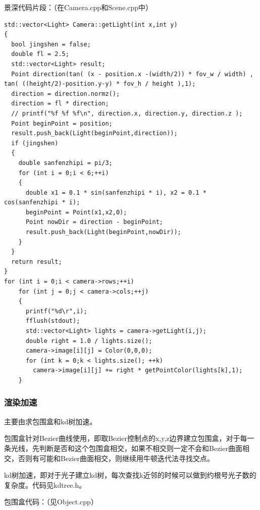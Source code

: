 \documentclass[10pt, a4paper]{article}
\begin{document}
          景深代码片段：（在Camera.cpp和Scene.cpp中）
          \begin{lstlisting}
std::vector<Light> Camera::getLight(int x,int y)
{
  bool jingshen = false;
  double fl = 2.5;
  std::vector<Light> result;
  Point direction(tan( (x - position.x -(width/2)) * fov_w / width) , tan( ((height/2)-position.y-y) * fov_h / height ),1);
  direction = direction.normz();
  direction = fl * direction;
  // printf("%f %f %f\n", direction.x, direction.y, direction.z );
  Point beginPoint = position;
  result.push_back(Light(beginPoint,direction));
  if (jingshen)
  {
    double sanfenzhipi = pi/3;
    for (int i = 0;i < 6;++i)
    {
      double x1 = 0.1 * sin(sanfenzhipi * i), x2 = 0.1 * cos(sanfenzhipi * i);
      beginPoint = Point(x1,x2,0);
      Point nowDir = direction - beginPoint;
      result.push_back(Light(beginPoint,nowDir));
    }
  }
  return result;
}
for (int i = 0;i < camera->rows;++i)
    for (int j = 0;j < camera->cols;++j)
    {
      printf("%d\r",i);
      fflush(stdout);
      std::vector<Light> lights = camera->getLight(i,j);
      double right = 1.0 / lights.size();
      camera->image[i][j] = Color(0,0,0);
      for (int k = 0;k < lights.size(); ++k)
        camera->image[i][j] += right * getPointColor(lights[k],1);
    }
          \end{lstlisting}
        \subsubsection{渲染加速}
          主要由求包围盒和kd树加速。

          包围盒针对Bezier曲线使用，即取Bezier控制点的x,y,z边界建立包围盒，对于每一条光线，先判断是否和这个包围盒相交，如果不相交则一定不会和Bezier曲面相交，否则有可能和Bezier曲面相交，则继续用牛顿迭代法寻找交点。

          kd树加速，即对于光子建立kd树，每次查找k近邻的时候可以做到约根号光子数的复杂度。代码见kdtree.h。

          包围盒代码：（见Object.cpp）
\end{document}
